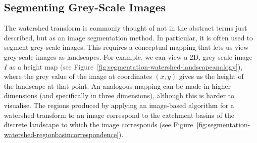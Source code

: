 
\subsection{Segmenting Grey-Scale Images}
\label{subsec:segmentation-watershed-greyscale}


The watershed transform is commonly thought of not in the abstract terms just described, but as an image segmentation method. In particular, it is often used to segment grey-scale images. This requires a conceptual mapping that lets us view grey-scale images as landscapes. For example, we can view a 2D, grey-scale image $I$ as a height map (see Figure~\ref{fig:segmentation-watershed-landscapeanalogy}), where the grey value of the image at coordinates $(x,y)$ gives us the height of the landscape at that point. An analogous mapping can be made in higher dimensions (and specifically in three dimensions), although this is harder to visualise. The regions produced by applying an image-based algorithm for a watershed transform to an image correspond to the catchment basins of the discrete landscape to which the image corresponds (see Figure~\ref{fig:segmentation-watershed-regionbasincorrespondence}).


